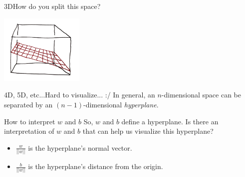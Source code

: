 \documentclass[xcolor=dvipsnames]{beamer}
\begin{document}
\begin{frame}{3D}{How do you split this space?}
    \begin{center}
        \includegraphics[width=0.3\textwidth]{figs/3d_sep_mine.png}\\
        \vspace{0.5em}
    \end{center}
    \vspace{2em}
\end{frame}

\begin{frame}{4D, 5D, etc...}{Hard to visualize... :/}
    In general, an $n$-dimensional space can be separated by an $(n-1)$-dimensional {\em hyperplane}.\\
    \vspace{2em}
\end{frame}

\begin{frame}{How to interpret $w$ and $b$}
    So, $w$ and $b$ define a hyperplane. Is there an interpretation of $w$ and $b$ that can help us visualize this hyperplane?
    \vspace{1em}
    \begin{itemize}
        \item<2-> $\frac{w}{||w||}$ is the hyperplane's normal vector.
        \item<3-> $\frac{b}{||w||}$ is the hyperplane's distance from the origin.
    \end{itemize}
    \vspace{2em}
\end{frame}
\end{document}
